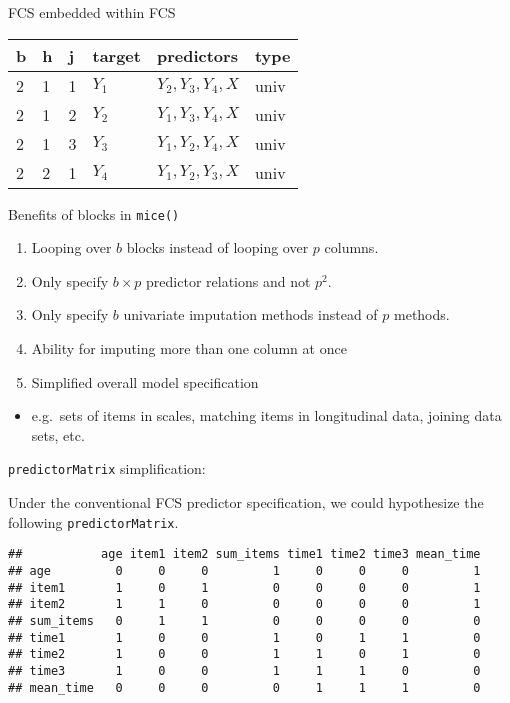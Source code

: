 \documentclass[ignorenonframetext,]{beamer}
\providecommand{\tightlist}{%
  \setlength{\itemsep}{0pt}\setlength{\parskip}{0pt}}
\begin{document}
\begin{frame}{FCS embedded within FCS}
\protect\hypertarget{fcs-embedded-within-fcs}{}

\begin{longtable}[]{@{}llllll@{}}
\toprule
b & h & j & target & predictors & type\tabularnewline
\midrule
\endhead
2 & 1 & 1 & \(Y_1\) & \(Y_2, Y_3, Y_4, X\) & univ\tabularnewline
2 & 1 & 2 & \(Y_2\) & \(Y_1, Y_3, Y_4, X\) & univ\tabularnewline
2 & 1 & 3 & \(Y_3\) & \(Y_1, Y_2, Y_4, X\) & univ\tabularnewline
2 & 2 & 1 & \(Y_4\) & \(Y_1, Y_2, Y_3, X\) & univ\tabularnewline
\bottomrule
\end{longtable}

\end{frame}

\begin{frame}{Benefits of blocks in \texttt{mice()}}
\protect\hypertarget{benefits-of-blocks-in-mice}{}

\begin{enumerate}
\tightlist
\item
  Looping over \(b\) blocks instead of looping over \(p\) columns.
\item
  Only specify \(b \times p\) predictor relations and not \(p^2\).
\item
  Only specify \(b\) univariate imputation methods instead of \(p\)
  methods.
\item
  Ability for imputing more than one column at once
\item
  Simplified overall model specification
\end{enumerate}

\begin{itemize}
\tightlist
\item
  e.g.~sets of items in scales, matching items in longitudinal data,
  joining data sets, etc.
\end{itemize}

\end{frame}

\begin{frame}[fragile]{\texttt{predictorMatrix} simplification:}
\protect\hypertarget{predictormatrix-simplification}{}

Under the conventional FCS predictor specification, we could hypothesize
the following \texttt{predictorMatrix}.

\begin{verbatim}
##           age item1 item2 sum_items time1 time2 time3 mean_time
## age         0     0     0         1     0     0     0         1
## item1       1     0     1         0     0     0     0         1
## item2       1     1     0         0     0     0     0         1
## sum_items   0     1     1         0     0     0     0         0
## time1       1     0     0         1     0     1     1         0
## time2       1     0     0         1     1     0     1         0
## time3       1     0     0         1     1     1     0         0
## mean_time   0     0     0         0     1     1     1         0
\end{verbatim}

\end{frame}
\end{document}
